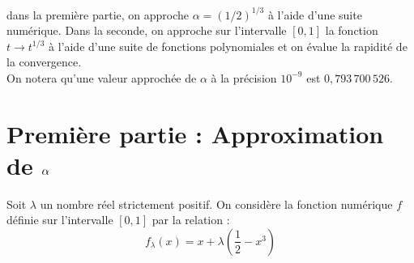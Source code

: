 \documentclass[11pt]{article}%
\begin{document}
 dans la première partie, on approche
$\alpha = (1/2)^{1/3}$ à l'aide d'une suite numérique. Dans la seconde,
on
approche sur l'intervalle $[0,1]$ la fonction $t\rightarrow t^{1/3}$ à
l'aide d'une suite de fonctions polynomiales et on évalue la rapidité
de la
convergence.\\
On notera qu'une valeur approchée de $\alpha $ à la précision $10^{-9}$
est $0,793\,700\,526$. 

\section*{Première partie : Approximation de $\protect\alpha $ }

Soit $\lambda $ un nombre réel strictement positif. On considère la
fonction
numérique $f$ définie sur l'intervalle $[0,1]$ par la relation : 
\[
f_{\lambda }(x) = x + \lambda \left( \frac{1}{2}-x^{3}\right) 
\]
\end{document}

